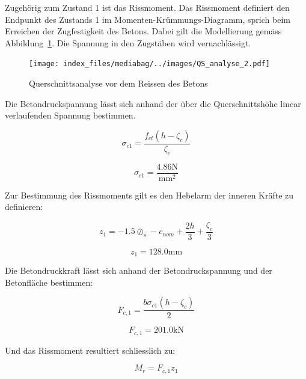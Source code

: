 \documentclass[
  12pt,
  letterpaper,
  egregdoesnotlikesansseriftitles]{scrreprt}
\begin{document}
Zugehörig zum Zustand 1 ist das Rissmoment. Das Rissmoment definiert den
Endpunkt des Zustands 1 im Momenten-Krümmungs-Diagramm, sprich beim
Erreichen der Zugfestigkeit des Betons. Dabei gilt die Modellierung
gemäss Abbildung~\ref{fig-qs2}. Die Spannung in den Zugstäben wird
vernachlässigt.

\begin{figure}[H]

{\centering \texttt{[image: index\_files/mediabag/../images/QS\_analyse\_2.pdf]}

}

\caption{\label{fig-qs2}Querschnittsanalyse vor dem Reissen des Betons}

\end{figure}

Die Betondruckspannung lässt sich anhand der über die Querschnittshöhe
linear verlaufenden Spannung bestimmen.

\begin{equation}\sigma_{c 1} = \frac{f_{ct} \left(h - \zeta_{c}\right)}{\zeta_{c}}\end{equation}

\begin{equation}\sigma_{c 1} = \frac{4.86 \text{N}}{\text{mm}^{2}}\end{equation}

Zur Bestimmung des Rissmoments gilt es den Hebelarm der inneren Kräfte
zu definieren:

\begin{equation}z_{1} = - 1.5 \oslash_{s} - c_{nom} + \frac{2 h}{3} + \frac{\zeta_{c}}{3}\end{equation}

\begin{equation}z_{1} = 128.0 \text{mm}\end{equation}

Die Betondruckkraft lässt sich anhand der Betondruckspannung und der
Betonfläche bestimmen:

\begin{equation}F_{c,1} = \frac{b \sigma_{c 1} \left(h - \zeta_{c}\right)}{2}\end{equation}

\begin{equation}F_{c,1} = 201.0 \text{kN}\end{equation}

Und das Rissmoment resultiert schliesslich zu:

\begin{equation}M_{r} = F_{c,1} z_{1}\end{equation}
\end{document}

